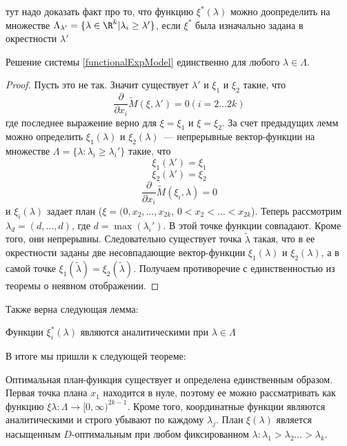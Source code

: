 { \color{blue} тут надо доказать факт про то, что функцию $\xi^{*}(\lambda)$ можно доопределить на множестве $\Lambda_{\lambda'} = \{\lambda \in \R^k | \lambda_i \geq \lambda' \}$, если $\xi^{*}$ была изначально задана в окрестности $\lambda'$ }
\begin{lem}
Решение системы \eqref{functionalExpModel} единственно для любого $\lambda \in \Lambda$.
\end{lem}
\begin{proof}
Пусть это не так. Значит существует $\lambda'$ и $\xi_1$ и $\xi_2$ такие, что 
$$\frac{\partial}{\partial x_i} \tilde{M}(\xi, \lambda') = 0 (i = 2…2k)$$
где последнее выражение верно для $\xi = \xi_1$ и $\xi=\xi_2$.
За счет предыдущих лемм можно определить $\xi_1(\lambda)$ и $\xi_2(\lambda)$ — непрерывные вектор-функции на множестве $\Lambda = \{ \lambda: \lambda_i \geq\lambda_i'\}$ такие, что
$$\xi_1(\lambda')=\xi_1$$
$$\xi_2(\lambda')=\xi_2$$
$$\frac{\partial}{\partial x_i} \tilde{M}(\xi_i, \lambda) = 0$$
и $\xi_{i}(\lambda)$ задает план ($\xi = (0, x_2, …, x_{2k}$, $0 < x_2 < … < x_{2k}$).
Теперь рассмотрим $\lambda_d = (d, …, d)$, где $d = \max(\lambda_{i}')$. В этой точке функции совпадают. Кроме того, они непрерывны. Следовательно существует точка $\tilde{\lambda}$ такая, что в ее окрестности заданы две несовпадающие вектор-функции $\xi_1(\lambda)$ и $\xi_2(\lambda)$, а в самой точке $\xi_1(\tilde{\lambda}) = \xi_2(\tilde{\lambda})$. Получаем противоречие с единственностью из теоремы о неявном отображении.
\end{proof}

Также верна следующая лемма:
\begin{lem}
Функции $\xi_i^{*}(\lambda)$ являются аналитическими при $\lambda \in \Lambda$
\end{lem}

В итоге мы пришли к следующей теореме:
\begin{thm}
Оптимальная план-функция существует и определена единственным образом. Первая точка плана $x_1$ находится в нуле, поэтому ее можно рассматривать как функцию $\xi{\lambda} : \Lambda \rightarrow [0, \infty)^{2k-1}$. Кроме того, координатные функции являются аналитическими и строго убывают по каждому $\lambda_j$. План $\xi(\lambda)$ является насыщенным $D$-оптимальным при любом фиксированном $\lambda: \lambda_1 > \lambda_2 … > \lambda_k$.
\end{thm}



